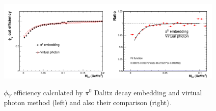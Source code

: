 \begin{figure}
\begin{centering}
\includegraphics[width=0.5\textwidth]{fig/3.Analysis/Efficiency/phiVeff}\includegraphics[width=0.5\textwidth]{fig/3.Analysis/Efficiency/comparePi0vsVirtualphoton}
\par\end{centering}

\protect\caption{$\phi_{V}$ efficiency calculated by $\pi^{0}$ Dalitz decay embedding
and virtual photon method (left) and also their comparison (right). }


\label{fig:phiV eff}
\end{figure}


